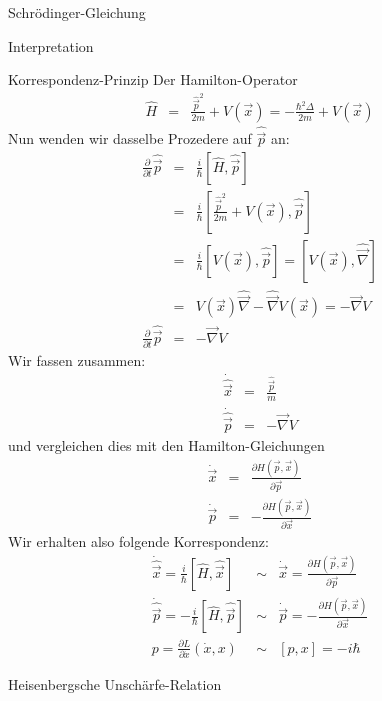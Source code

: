 \begin{chapter}{\titlestr}
\begin{section}{Schrödinger-Gleichung}
\begin{subsection}{Interpretation}
\begin{subsubsection}{Korrespondenz-Prinzip}
Der Hamilton-Operator
\begin{eqnarray*}
\hat{H} &=& \frac{\hat{\vec{p}}^2}{2m}+V(\vec{x})=-\frac{\hbar^2\Delta}{2m}+V(\vec{x})
\end{eqnarray*}
Nun wenden wir dasselbe Prozedere auf $\hat{\vec{p}}$ an:
\begin{eqnarray*}
\frac{\partial}{\partial t}\hat{\vec{p}} &=&\frac{i}{\hbar}[\hat{H},\hat{\vec{p}}]\\
&=& \frac{i}{\hbar}\left[\frac{\hat{\vec{p}}^2}{2m}+V(\vec{x}),\hat{\vec{p}}\right]\\
&=& \frac{i}{\hbar}\left[V(\vec{x}),\hat{\vec{p}}\right]=\left[V(\vec{x}),\hat{\vec{\nabla}}\right]\\
&=&V(\vec{x})\hat{\vec{\nabla}}-\hat{\vec{\nabla}}V(\vec{x})=-\vec{\nabla}V\\
\frac{\partial}{\partial t}\hat{\vec{p}} &=&-\vec{\nabla}V
\end{eqnarray*}
Wir fassen zusammen:
\begin{eqnarray*}
\dot{\hat{\vec{x}}} &=& \frac{\hat{\vec{p}}}{m}\\
\dot{\hat{\vec{p}}} &=&-\vec{\nabla}V
\end{eqnarray*}
und vergleichen dies mit den Hamilton-Gleichungen
\begin{eqnarray*}
\dot{\vec{x}} &=& \frac{\partial H(\vec{p},\vec{x})}{\partial \vec{p}}\\
\dot{\vec{p}} &=&-\frac{\partial H(\vec{p},\vec{x})}{\partial \vec{x}}
\end{eqnarray*}
Wir erhalten also folgende Korrespondenz:
\begin{eqnarray*}
\dot{\hat{\vec{x}}}=\frac{i}{\hbar}[\hat{H},\hat{\vec{x}}] &\sim&\dot{\vec{x}} =\frac{\partial H(\vec{p},\vec{x})}{\partial \vec{p}}\\
\dot{\hat{\vec{p}}}=-\frac{i}{\hbar}[\hat{H},\hat{\vec{p}}] &\sim&\dot{\vec{p}} =-\frac{\partial H(\vec{p},\vec{x})}{\partial \vec{x}}\\
p = \frac{\partial L}{\partial \dot{x}}(\dot{x},x)&\sim& [p,x] =-i\hbar
\end{eqnarray*}
\end{subsubsection}

\begin{subsubsection}{Heisenbergsche Unschärfe-Relation}
\end{subsubsection}
\end{subsection}


\end{section}


\end{chapter}
